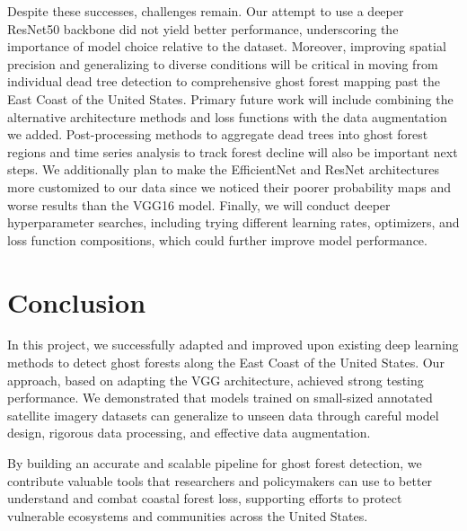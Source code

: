 \documentclass[conference]{ieeetran}
\begin{document}
Despite these successes, challenges remain. Our attempt to use a deeper ResNet50 backbone did not yield better performance, underscoring the importance of model choice relative to the dataset. Moreover, improving spatial precision and generalizing to diverse conditions will be critical in moving from individual dead tree detection to comprehensive ghost forest mapping past the East Coast of the United States.
Primary future work will include combining the alternative architecture methods and loss functions with the data augmentation we added.
Post-processing methods to aggregate dead trees into ghost forest regions and time series analysis to track forest decline will also be important next steps. We additionally plan to make the EfficientNet and ResNet architectures more customized to our data since we noticed their poorer probability maps and worse results than the VGG16 model.
Finally, we will conduct deeper hyperparameter searches, including trying different learning rates, optimizers, and loss function compositions, which could further improve model performance. 

\section{Conclusion}
In this project, we successfully adapted and improved upon existing deep learning methods to detect ghost forests along the East Coast of the United States. Our approach, based on adapting the VGG architecture, achieved strong testing performance. We demonstrated that models trained on small-sized annotated satellite imagery datasets can generalize to unseen data through careful model design, rigorous data processing, and effective data augmentation.

By building an accurate and scalable pipeline for ghost forest detection, we contribute valuable tools that researchers and policymakers can use to better understand and combat coastal forest loss, supporting efforts to protect vulnerable ecosystems and communities across the United States.


\end{document}
